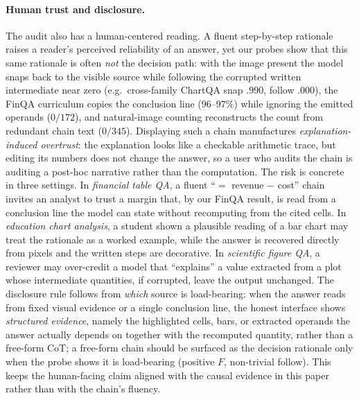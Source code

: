\documentclass[11pt]{article}
\begin{document}
\paragraph{Human trust and disclosure.}
The audit also has a human-centered reading. A fluent step-by-step rationale raises a reader's perceived reliability of an answer, yet our probes show that this same rationale is often \emph{not} the decision path: with the image present the model snaps back to the visible source while following the corrupted written intermediate near zero (e.g.\ cross-family ChartQA snap $.990$, follow $.000$), the FinQA curriculum copies the conclusion line ($96$--$97\%$) while ignoring the emitted operands ($0/172$), and natural-image counting reconstructs the count from redundant chain text ($0/345$). Displaying such a chain manufactures \emph{explanation-induced overtrust}: the explanation looks like a checkable arithmetic trace, but editing its numbers does not change the answer, so a user who audits the chain is auditing a post-hoc narrative rather than the computation. The risk is concrete in three settings. In \emph{financial table QA}, a fluent ``$=$ revenue $-$ cost'' chain invites an analyst to trust a margin that, by our FinQA result, is read from a conclusion line the model can state without recomputing from the cited cells. In \emph{education chart analysis}, a student shown a plausible reading of a bar chart may treat the rationale as a worked example, while the answer is recovered directly from pixels and the written steps are decorative. In \emph{scientific figure QA}, a reviewer may over-credit a model that ``explains'' a value extracted from a plot whose intermediate quantities, if corrupted, leave the output unchanged. The disclosure rule follows from \emph{which} source is load-bearing: when the answer reads from fixed visual evidence or a single conclusion line, the honest interface shows \emph{structured evidence}, namely the highlighted cells, bars, or extracted operands the answer actually depends on together with the recomputed quantity, rather than a free-form CoT; a free-form chain should be surfaced as the decision rationale only when the probe shows it is load-bearing (positive $F$, non-trivial follow). This keeps the human-facing claim aligned with the causal evidence in this paper rather than with the chain's fluency.
\end{document}
